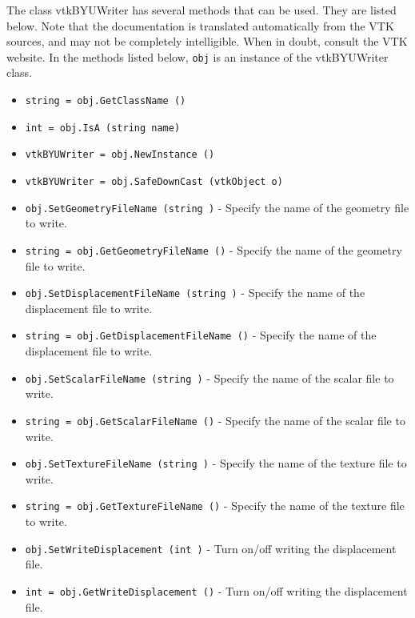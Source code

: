 The class vtkBYUWriter has several methods that can be used.
  They are listed below.
Note that the documentation is translated automatically from the VTK sources,
and may not be completely intelligible.  When in doubt, consult the VTK website.
In the methods listed below, \verb|obj| is an instance of the vtkBYUWriter class.
\begin{itemize}
\item  \verb|string = obj.GetClassName ()|

\item  \verb|int = obj.IsA (string name)|

\item  \verb|vtkBYUWriter = obj.NewInstance ()|

\item  \verb|vtkBYUWriter = obj.SafeDownCast (vtkObject o)|

\item  \verb|obj.SetGeometryFileName (string )| -  Specify the name of the geometry file to write.

\item  \verb|string = obj.GetGeometryFileName ()| -  Specify the name of the geometry file to write.

\item  \verb|obj.SetDisplacementFileName (string )| -  Specify the name of the displacement file to write.

\item  \verb|string = obj.GetDisplacementFileName ()| -  Specify the name of the displacement file to write.

\item  \verb|obj.SetScalarFileName (string )| -  Specify the name of the scalar file to write.

\item  \verb|string = obj.GetScalarFileName ()| -  Specify the name of the scalar file to write.

\item  \verb|obj.SetTextureFileName (string )| -  Specify the name of the texture file to write.

\item  \verb|string = obj.GetTextureFileName ()| -  Specify the name of the texture file to write.

\item  \verb|obj.SetWriteDisplacement (int )| -  Turn on/off writing the displacement file.

\item  \verb|int = obj.GetWriteDisplacement ()| -  Turn on/off writing the displacement file.


\end{itemize}
